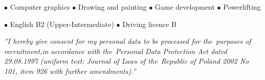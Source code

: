 \documentclass[11pt,a4paper]{article}
\begin{document}
    \bigskip


    \smallskip
    $\bullet$ Computer graphics
    \hspace{0.34cm}
    $\bullet$ Drawing and painting
    \hspace{0.34cm}
    $\bullet$ Game development
    \hspace{0.34cm}
    $\bullet$ Powerlifting


    \bigskip


    \smallskip
    $\bullet$ English B2 (Upper-Intermediate)
    \hspace{0.34cm}
    $\bullet$ Driving licence B

  
    \vspace{0.92cm}
    \noindent \textit{''I hereby give consent for my personal data to be processed for the~purposes
    of recruitment,\linebreak in accordance with the~Personal Data Protection Act dated 29.08.1997
    (uniform text: Journal of Laws of the~Republic of Poland 2002 No 101, item 926
    with further amendments).''}
\end{document}
